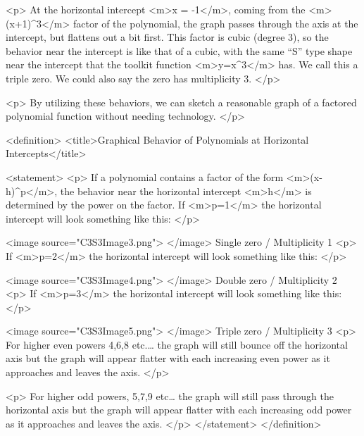         <p>
            At the horizontal intercept <m>x = -1</m>, coming from the <m>(x+1)^{3}</m> factor of the polynomial, the graph passes through the axis at the intercept, but flattens out a bit first.
            This factor is cubic (degree 3), so the behavior near the intercept is like that of a cubic, with the same “S” type shape near the intercept that the toolkit function <m>y=x^{3}</m> has.
            We call this a triple zero.
            We could also say the zero has multiplicity 3.
        </p>

        <p>
            By utilizing these behaviors, we can sketch a reasonable graph of a factored polynomial function without needing technology.
        </p>

        <definition>
            <title>Graphical Behavior of Polynomials at Horizontal Intercepts</title>

            <statement>
                <p>
                    If a polynomial contains a factor of the form <m>(x-h)^{p}</m>, the behavior near the horizontal intercept <m>h</m> is determined by the power on the factor.
                    If <m>p=1</m> the horizontal intercept will look something like this:
                </p>

                <image source="C3S3Image3.png">
                </image>
                Single zero / Multiplicity 1
                <p>
                    If <m>p=2</m> the horizontal intercept will look something like this:
                </p>

                <image source="C3S3Image4.png">
                </image>
                Double zero / Multiplicity 2
                <p>
                    If <m>p=3</m> the horizontal intercept will look something like this:
                </p>

                <image source="C3S3Image5.png">
                </image>
                Triple zero / Multiplicity 3
                <p>
                    For higher even powers 4,6,8 etc.… the graph will still bounce off the horizontal axis but the graph will appear flatter with each increasing even power as it approaches and leaves the axis.
                </p>

                <p>
                    For higher odd powers, 5,7,9 etc… the graph will still pass through the horizontal axis but the graph will appear flatter with each increasing odd power as it approaches and leaves the axis.
                </p>
            </statement>
        </definition>

